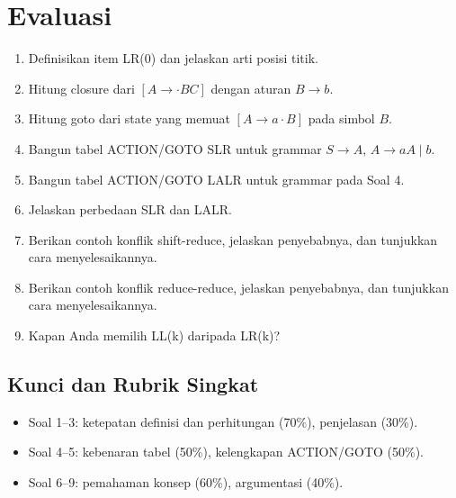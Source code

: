 \section*{Evaluasi}

\begin{enumerate}[label=\arabic*.,leftmargin=*]
  \item Definisikan item LR(0) dan jelaskan arti posisi titik.
  \item Hitung closure dari \([A \to \cdot B C]\) dengan aturan
        \(B \to b\).
  \item Hitung goto dari state yang memuat \([A \to a \cdot B]\)
        pada simbol \(B\).
  \item Bangun tabel ACTION/GOTO SLR untuk grammar
        \(S \to A\), \(A \to a A \mid b\).
  \item Bangun tabel ACTION/GOTO LALR untuk grammar pada Soal 4.
  \item Jelaskan perbedaan SLR dan LALR.
  \item Berikan contoh konflik shift-reduce, jelaskan penyebabnya, dan
        tunjukkan cara menyelesaikannya.
  \item Berikan contoh konflik reduce-reduce, jelaskan penyebabnya, dan
        tunjukkan cara menyelesaikannya.
  \item Kapan Anda memilih LL(k) daripada LR(k)?
\end{enumerate}

\subsection*{Kunci dan Rubrik Singkat}
\begin{itemize}[leftmargin=*]
  \item Soal 1--3: ketepatan definisi dan perhitungan (70\%),
        penjelasan (30\%).
  \item Soal 4--5: kebenaran tabel (50\%), kelengkapan ACTION/GOTO
        (50\%).
  \item Soal 6--9: pemahaman konsep (60\%), argumentasi (40\%).
\end{itemize}

